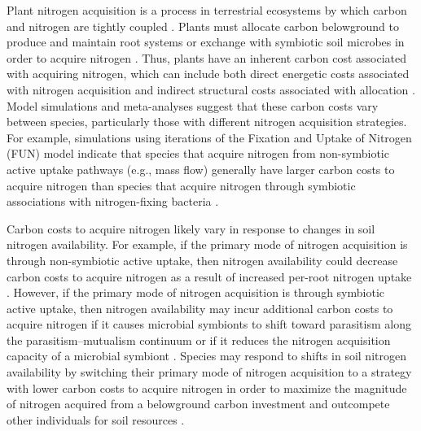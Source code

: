 Plant nitrogen acquisition is a process in terrestrial ecosystems by which carbon and nitrogen are tightly coupled . Plants must allocate carbon belowground to produce and maintain root systems or exchange with symbiotic soil microbes in order to acquire nitrogen . Thus, plants have an inherent carbon cost associated with acquiring nitrogen, which can include both direct energetic costs associated with nitrogen acquisition and indirect structural costs associated with allocation . Model simulations  and meta-analyses  suggest that these carbon costs vary between species, particularly those with different nitrogen acquisition strategies. For example, simulations using iterations of the Fixation and Uptake of Nitrogen (FUN) model indicate that species that acquire nitrogen from non-symbiotic active uptake pathways (e.g., mass flow) generally have larger carbon costs to acquire nitrogen than species that acquire nitrogen through symbiotic associations with nitrogen-fixing bacteria .

Carbon costs to acquire nitrogen likely vary in response to changes in soil nitrogen availability. For example, if the primary mode of nitrogen acquisition is through non-symbiotic active uptake, then nitrogen availability could decrease carbon costs to acquire nitrogen as a result of increased per-root nitrogen uptake . However, if the primary mode of nitrogen acquisition is through symbiotic active uptake, then nitrogen availability may incur additional carbon costs to acquire nitrogen if it causes microbial symbionts to shift toward parasitism along the parasitism–mutualism continuum  or if it reduces the nitrogen acquisition capacity of a microbial symbiont . Species may respond to shifts in soil nitrogen availability by switching their primary mode of nitrogen acquisition to a strategy with lower carbon costs to acquire nitrogen in order to maximize the magnitude of nitrogen acquired from a belowground carbon investment and outcompete other individuals for soil resources .

